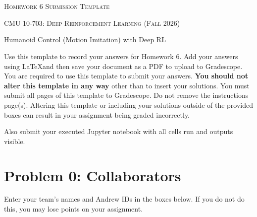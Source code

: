 \documentclass[12pt]{article}
\begin{document}
\section*{}
\begin{center}
  \centerline{\textsc{\LARGE  Homework 6 Submission Template}}
  \vspace{0.5em}
  \textsc{\large CMU 10-703: Deep Reinforcement Learning (Fall 2026)}
  \vspace{0.5em}
  \centerline{Humanoid Control (Motion Imitation) with Deep RL}
\end{center}

Use this template to record your answers for Homework 6. Add your answers using \LaTeX and then save your document as a PDF to upload to Gradescope. You are required to use this template to submit your answers. \textbf{You should not alter this template in any way} other than to insert your solutions. You must submit all \pageref{LastPage} pages of this template to Gradescope. Do not remove the instructions page(s). Altering this template or including your solutions outside of the provided boxes can result in your assignment being graded incorrectly.

Also submit your executed Jupyter notebook with all cells run and outputs visible.

\newpage

\section*{Problem 0: Collaborators}
Enter your team's names and Andrew IDs in the boxes below. If you do not do this, you may lose points on your assignment.
\end{document}
